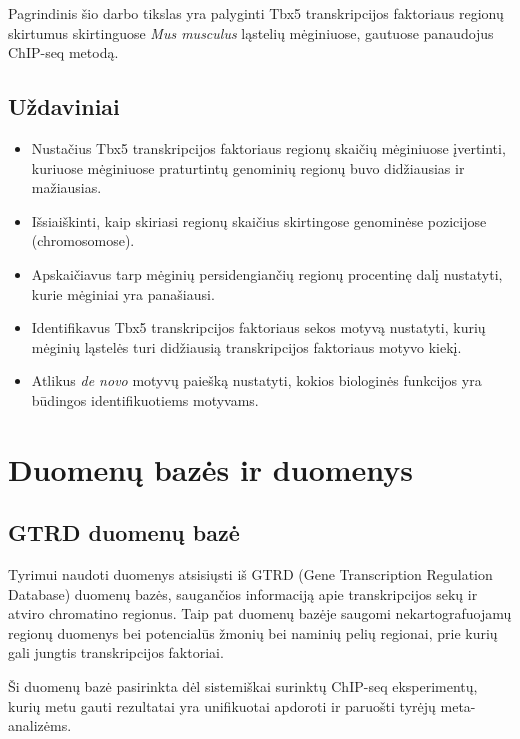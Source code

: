 \documentclass[12pt]{article}
\begin{document}
Pagrindinis šio darbo tikslas yra palyginti Tbx5 transkripcijos faktoriaus
regionų skirtumus skirtinguose \emph{Mus musculus} ląstelių mėginiuose,
gautuose panaudojus ChIP-seq metodą.

\subsection*{Uždaviniai}
\begin{itemize}
    \item Nustačius Tbx5 transkripcijos faktoriaus regionų skaičių mėginiuose
    įvertinti, kuriuose mėginiuose praturtintų genominių regionų buvo
    didžiausias ir mažiausias.
    \item Išsiaiškinti, kaip skiriasi regionų skaičius skirtingose genominėse
    pozicijose (chromosomose).
    \item Apskaičiavus tarp mėginių persidengiančių regionų procentinę dalį
    nustatyti, kurie mėginiai yra panašiausi.
    \item Identifikavus Tbx5 transkripcijos faktoriaus sekos motyvą nustatyti,
    kurių mėginių ląstelės turi didžiausią transkripcijos faktoriaus motyvo
    kiekį.
    \item Atlikus \emph{de novo} motyvų paiešką nustatyti, kokios biologinės
    funkcijos yra būdingos identifikuotiems motyvams.
\end{itemize}

\newpage


\section{Duomenų bazės ir duomenys}
\subsection{GTRD duomenų bazė}
Tyrimui naudoti duomenys atsisiųsti iš GTRD (Gene Transcription Regulation
Database)\cite{GTRD} duomenų bazės, saugančios informaciją apie transkripcijos
sekų ir atviro chromatino regionus. Taip pat duomenų bazėje saugomi
nekartografuojamų regionų duomenys bei potencialūs žmonių bei naminių pelių
regionai, prie kurių gali jungtis transkripcijos faktoriai.

Ši duomenų bazė pasirinkta dėl sistemiškai surinktų ChIP-seq eksperimentų,
kurių metu gauti rezultatai yra unifikuotai apdoroti ir paruošti tyrėjų
meta-analizėms.
\end{document}
